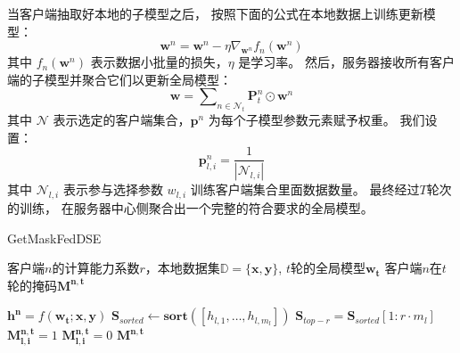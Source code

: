 当客户端抽取好本地的子模型之后，
按照下面的公式在本地数据上训练更新模型：
\begin{equation}
    \mathbf{w}^n = \mathbf{w}^n - \eta \nabla_{\mathbf{w}^n} f_n(\mathbf{w}^n)
\end{equation}
其中 $f_n(\mathbf{w}^n)$ 表示数据小批量的损失，$\eta$ 是学习率。
然后，服务器接收所有客户端的子模型并聚合它们以更新全局模型：
\begin{equation}
    \mathbf{w} = \sum\nolimits_{n \in \mathcal{N}_t} \mathbf{P}_t^n \odot \mathbf{w}^n
\end{equation}
其中 $\mathcal{N}$ 表示选定的客户端集合，$\mathbf{p}^n$ 为每个子模型参数元素赋予权重。
我们设置：
\begin{equation}
    \mathbf{p}^n_{l,i}=\frac{1}{|\mathcal{N}_{l,i}|}
\end{equation}
其中 $\mathcal{N}_{l,i}$ 表示参与选择参数 $w_{l,i}$ 训练客户端集合里面数据数量。
最终经过$T$轮次的训练，
在服务器中心侧聚合出一个完整的符合要求的全局模型。
\begin{algorithm}[thbp]
    \caption{GetMaskFedDSE}
    \label{alg:GetMaskFedDSE}
    \begin{algorithmic}[1]
    \Require 客户端$n$的计算能力系数$r$，本地数据集$\mathbb{D}=\{ \mathbf{x}, \mathbf{y} \}$, $t$轮的全局模型$\mathbf{w_{t}}$
    \Ensure 客户端$n$在$t$轮的掩码$\mathbf{M^{n,t}}$
    
        \State $\mathbf{h^n} = f(\mathbf{w_t}; \mathbf{x, \mathbf{y}})$
            \State $\mathbf{S}_{sorted} \leftarrow \textbf{sort}([h_{l,1},\ldots, h_{l,m_l}])$
            \State $\mathbf{S}_{top-r} = \mathbf{S}_{sorted}[1 : r \cdot m_l]$
              $\mathbf{M^{n,t}_{l,i}} = 1$
            \Else \text{ }$\mathbf{M^{n,t}_{l,i}} = 0$
            \EndIf
        \EndFor
        \State \Return $\mathbf{M^{n,t}}$
    \EndProcedure
\end{algorithmic}
\end{algorithm}


